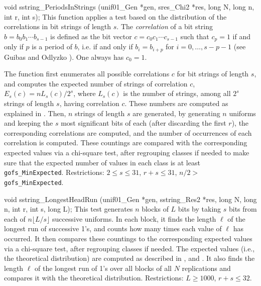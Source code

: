 
\code


void sstring_PeriodsInStrings (unif01_Gen *gen, sres_Chi2 *res, 
                               long N, long n, int r, int s);
\endcode
 \tab  This function applies a test 
%
   based on the distribution of the correlations 
%
   in  bit strings of length $s$.
   The {\em correlation\/} of a bit string $b = b_0 b_1 \cdots b_{s-1}$
   is defined as the bit vector $c = c_0 c_1 \cdots c_{s-1}$ such that 
   $c_p=1$ if and only if $p$ is a period of $b$, i.e.  if and only if
   $b_i = b_{i+p}$ for $i=0,\dots,s-p-1$ 
   (see Guibas and Odlyzko \cite{pGUI81a}).
   One always has $c_0=1$.

   The function first enumerates all possible correlations $c$ for bit
   strings of length $s$, and computes  the expected number of strings
   of correlation $c$, $E_s(c) = n L_s(c)/2^s$, 
   where $L_s(c)$ is the number of strings, among all $2^s$ strings 
   of length $s$, having correlation $c$.
   These numbers are computed as explained in \cite{pGUI81a}.
   Then, $n$ strings of length $s$ are generated, by generating $n$
   uniforms and keeping the $s$ most significant bits of each
   (after discarding the first $r$), the corresponding correlations are
   computed, and the number of occurrences of each correlation is
   computed.  These countings are compared with the corresponding
   expected values via a chi-square test, after regrouping classes
   if needed to make sure that the expected number of values in each class
   is at least {\tt gofs\_MinExpected}.
   Restrictions: $2 \le s \le 31$, $r + s \le 31$,
   $n/2 > $ {\tt gofs\_MinExpected}.
 \endtab
\code


void sstring_LongestHeadRun (unif01_Gen *gen, sstring_Res2 *res,
                             long N, long n, int r, int s, long L);
\endcode
 \tab  This test 
%
   generates $n$ blocks of $L$ bits by taking $s$ bits
   from each of $n \lfloor L/s\rfloor$ successive uniforms.
   In each block, it finds the length $\ell$ of the longest run 
   of successive 1's, and counts how many times each value of $\ell$
   has occurred.  It then compares these countings to the corresponding
   expected values via a chi-square test, after regrouping classes
   if needed.  The expected values (i.e., the theoretical distribution)
   are computed as described in \cite{tFOL79a}, \cite{tGOR86a} and
   \cite[p. 21]{rRUK01a}. It also finds the length $\ell$ of the longest run 
   of 1's over all blocks of  all $N$ replications
   and compares it with  the theoretical distribution.
   Restrictions: $L \ge 1000$,  $r + s \le 32$.
 \endtab
{}
\code


